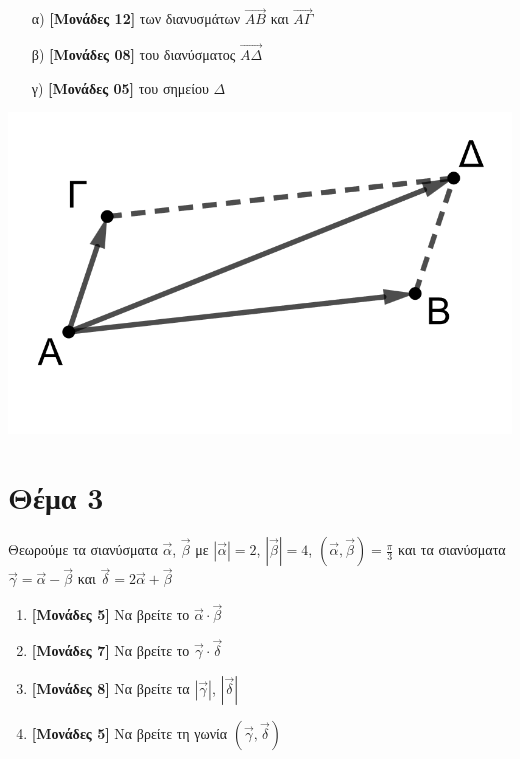 \documentclass[12pt]{article}
\begin{document}
\begin{enumerate}
 \item [α)] \textbf{[Μονάδες 12]} των διανυσμάτων $\overrightarrow{ΑΒ}$ και $\overrightarrow{ΑΓ}$
 \item [β)] \textbf{[Μονάδες 08]} του διανύσματος $\overrightarrow{ΑΔ}$
 \item [γ)] \textbf{[Μονάδες 05]} του σημείου $Δ$
\end{enumerate}
\includegraphics[scale=0.25]{"2022.png"}

\section*{Θέμα 3}
\noindent
Θεωρούμε τα σιανύσματα $\vec{α}$, $\vec{β}$ με $|\vec{α}|=2$, $|\vec{β}|=4$, $(\vec{α},\vec{β})=\frac{π}{3}$ και τα σιανύσματα $\vec{γ}=\vec{α}-\vec{β}$ και $\vec{δ}=2\vec{α}+\vec{β}$
\begin{enumerate}
 \item \textbf{[Μονάδες 5]} Να βρείτε το $\vec{α}\cdot\vec{β}$
 \item \textbf{[Μονάδες 7]} Να βρείτε το $\vec{γ}\cdot\vec{δ}$
 \item \textbf{[Μονάδες 8]} Να βρείτε τα $|\vec{γ}|$, $|\vec{δ}|$
 \item \textbf{[Μονάδες 5]} Να βρείτε τη γωνία $(\vec{γ},\vec{δ})$
\end{enumerate}
\end{document}
